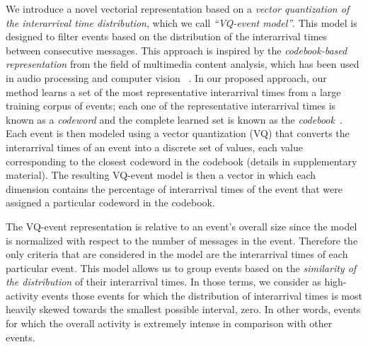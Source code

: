 We introduce a novel vectorial representation based on a {\em vector
quantization of the interarrival time distribution}, which we call 
{\em ``VQ-event model''}. This model is
designed to filter events based on the distribution of the
interarrival times between consecutive messages.  This approach is inspired
by the {\em codebook-based representation} from the field of multimedia
content
analysis, which has been used in audio processing and computer vision
~\cite{ff,Vaizman}.  In our proposed approach, our method learns a set of
the most
representative interarrival times from a large training corpus of events;
each one of the representative interarrival times is known as a
{\em codeword} and the complete learned set is known as the {\em
codebook}~\cite{Vaizman}.  
Each event is then modeled using a vector quantization (VQ) that
converts the interarrival times of an event into a discrete set of values,
each value corresponding to the closest codeword in the codebook (details
in supplementary material).  The resulting VQ-event model is then a
vector in which each dimension contains the percentage of interarrival times
of the event that were assigned a particular codeword in the codebook.


The VQ-event representation is relative to an event's overall size
since the model is normalized with respect to the number of messages in the
event. Therefore the only criteria that are considered in the model are the
interarrival times of each particular event. This model allows us to group events based on the
{\em similarity of the distribution} of their interarrival times.
In those terms, we consider as high-activity events those events for which
the distribution of interarrival times is most heavily
skewed towards the smallest possible interval, zero.  In other words,
events for which the overall activity is extremely intense in comparison
with other events.

